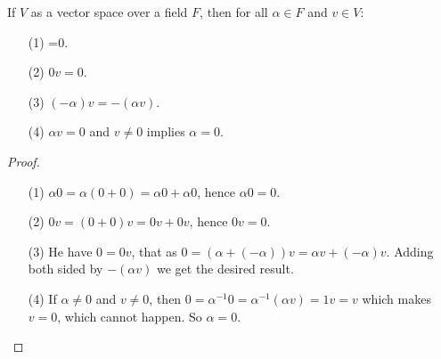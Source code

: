 \begin{lemma}
    If $V$ as a vector space over a field  $F$, then for all  $\alpha \in F$ and
     $v \in V$:
        \begin{enumerate}
            \item[(1)] =0.

            \item[(2)] $0v=0$.

            \item[(3)] $(-\alpha)v=-(\alpha v)$.

            \item[(4)] $\alpha v=0$ and $v \neq 0$ implies $\alpha=0$.
        \end{enumerate}
\end{lemma}
\begin{proof}
    \begin{enumerate}
        \item[(1)] $\alpha0=\alpha(0+0)=\alpha0+\alpha0$, hence $\alpha0=0$.

        \item[(2)] $0v=(0+0)v=0v+0v$, hence $0v=0$.

        \item[(3)] He have $0=0v$, that as $0=(\alpha+(-\alpha))v=\alpha
            v+(-\alpha)v$. Adding both sided by $-(\alpha v)$ we get the desired
            result.

        \item[(4)] If  $\alpha \neq 0$ and $v \neq 0$, then $0=\alpha^{-1}0=\alpha^{-1}(\alpha v)=1v=v$
            which makes $v=0$, which cannot happen. So $\alpha=0$.
    \end{enumerate}
\end{proof}

